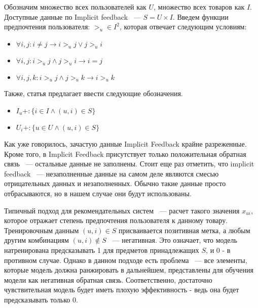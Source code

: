 \documentclass[14pt]{mmcs_article}
\begin{document}
Обозначим множество всех пользователей как $U$, множество всех товаров как $I$. Доступные данные по Implicit feedback ~---  $S = U \times I$. Введем функции предпочтения пользователя: $ >_u \in I^2$, которая отвечает следующим условиям:
\begin{itemize}
	\item $\forall i, j : i \neq j \rightarrow i >_u j \vee j >_u i$
	\item $\forall i, j : i >_u j \wedge j >_u i \rightarrow i = j$
	\item $\forall i, j, k :  i >_u j \wedge j >_u k  \rightarrow i >_u k $
\end{itemize}
Также, статья \cite{BPR:1205} предлагает ввести следующие обозначения. 
\begin{itemize}
	\item $I_u+: \{i \in I \wedge (u,i) \in S\}$
	\item $U_i+: \{u \in U \wedge (u,i) \in S\}$
\end{itemize}

Как уже говорилось, зачастую данные Implicit Feedback крайне разреженные. Кроме того, в Implicit Feedback присутствует только положительная обратная связь ~--- остальные данные не заполнены. Стоит еще раз отметить, что implicit feedback ~--- незаполненные данные на самом деле являются смесью отрицательных данных и незаполненных.
Обычно такие данные просто отбрасываются, но в нашем случае они будут использованы.

Типичный подход для рекомендательных систем ~--- расчет такого значения $x_{ui}$, которое отражает степень предпочтения пользователя к данному товару. Тренировочным данным $(u,i) \in S$ присваивается позитивная метка, а любым другим комбинациям $(u,i) \notin S$ ~--- негативная. Это означает, что модель натренирована предсказывать 1 для предметов принадлежащих $S$, и 0 - в противном случае. Однако в данном подходе есть проблема ~--- все элементы, которые модель должна ранжировать в дальнейшем, представлены для обучения модели как негативная обратная связь. Соответственно, достаточно чувствительная модель будет иметь плохую эффективность - ведь она будет предсказывать только 0.    
\end{document}
